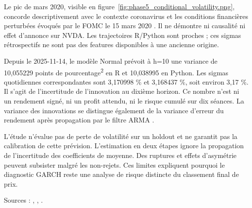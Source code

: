 Le pic de mars 2020, visible en figure~\ref{fig:phase5_conditional_volatility.png}, concorde descriptivement avec le contexte coronavirus et les conditions financières perturbées évoqués par le FOMC le 15 mars 2020 \cite{R17}. Il ne démontre ni causalité ni effet d’annonce sur NVDA. Les trajectoires R/Python sont proches ; ces sigmas rétrospectifs ne sont pas des features disponibles à une ancienne origine.



Depuis le 2025-11-14, le modèle Normal prévoit à h=10 une variance de 10,055229 points de pourcentage\textsuperscript{2} en R et 10,038995 en Python. Les sigmas quotidiennes correspondantes sont 3,170998 \% et 3,168437 \%, soit environ 3,17 \%. Il s’agit de l’incertitude de l’innovation au dixième horizon. Ce nombre n’est ni un rendement signé, ni un profit attendu, ni le risque cumulé sur dix séances. La variance des innovations se distingue également de la variance d’erreur du rendement après propagation par le filtre ARMA \cite{R10}.



L’étude n’évalue pas de perte de volatilité sur un holdout et ne garantit pas la calibration de cette prévision. L’estimation en deux étapes ignore la propagation de l’incertitude des coefficients de moyenne. Des ruptures et effets d’asymétrie peuvent subsister malgré les non-rejets. Ces limites expliquent pourquoi le diagnostic GARCH reste une analyse de risque distincte du classement final de prix.



Sources : , , .
